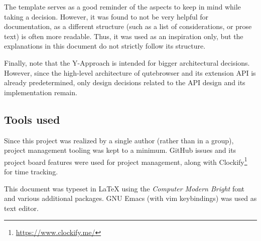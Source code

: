The template serves as a good reminder of the aspects to keep in mind
while taking a decision. However, it was found to not be very helpful for
documentation, as a different structure (such as a list of considerations, or
prose text) is often more readable. Thus, it was used as an inspiration only,
but the explanations in this document do not strictly follow its structure.

Finally, note that the Y-Approach is intended for bigger architectural
decisions. However, since the high-level architecture of qutebrowser and its
extension API is already predetermined, only design decisions related to the API
design and its implementation remain.

\subsection{Tools used}
Since this project was realized by a single author (rather than in a group),
project management tooling was kept to a minimum. GitHub issues and its project
board features were used for project management, along with
Clockify\footnote{\url{https://www.clockify.me/}} for time tracking.

This document was typeset in \LaTeX{} using the \emph{Computer Modern Bright}
font and various additional packages. GNU Emacs (with vim keybindings) was used
as text editor.